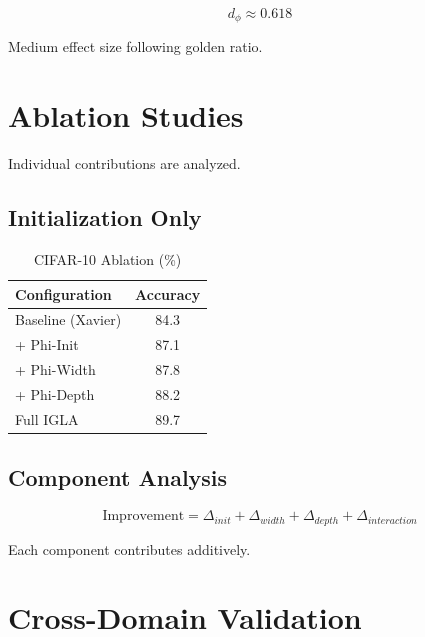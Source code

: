 \begin{theorem}
\label{thm:golden-effect}
\begin{equation}
d_{\phi} \approx 0.618
\end{equation}

Medium effect size following golden ratio.
\end{theorem}

\section{Ablation Studies}

Individual contributions are analyzed.

\subsection{Initialization Only}

\begin{table}[h]
\centering
\caption{CIFAR-10 Ablation (\%)}
\begin{tabular}{lc}
\toprule
Configuration & Accuracy \\
\midrule
Baseline (Xavier) & 84.3 \\
+ Phi-Init & 87.1 \\
+ Phi-Width & 87.8 \\
+ Phi-Depth & 88.2 \\
Full IGLA & 89.7 \\
\bottomrule
\end{tabular}
\end{table}

\subsection{Component Analysis}

\begin{proposition}
\label{prop:component}
\begin{equation}
\text{Improvement} = \Delta_{init} + \Delta_{width} + \Delta_{depth} + \Delta_{interaction}
\end{equation}

Each component contributes additively.
\end{proposition}

\section{Cross-Domain Validation}

